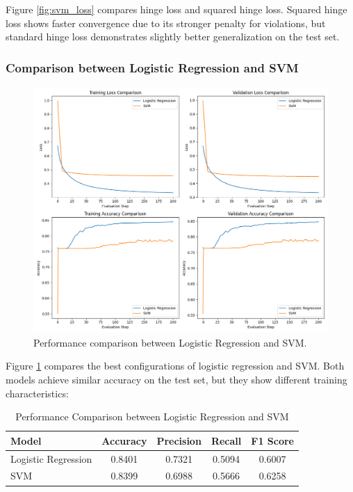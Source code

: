 \documentclass[journal, a4paper]{IEEEtran}
\begin{document}
Figure \ref{fig:svm_loss} compares hinge loss and squared hinge loss. Squared hinge loss shows faster convergence due to its stronger penalty for violations, but standard hinge loss demonstrates slightly better generalization on the test set.

\subsubsection{Comparison between Logistic Regression and SVM}

\begin{figure}[htbp]
\centering
\includegraphics[width=\linewidth]{lr_vs_svm_comparison.png}
\caption{Performance comparison between Logistic Regression and SVM.}
\label{fig:lr_vs_svm}
\end{figure}

Figure \ref{fig:lr_vs_svm} compares the best configurations of logistic regression and SVM. Both models achieve similar accuracy on the test set, but they show different training characteristics:

\begin{table}[htbp]
\centering
\caption{Performance Comparison between Logistic Regression and SVM}
\label{tab:comparison}
\begin{tabular}{lcccc}
\toprule
\textbf{Model} & \textbf{Accuracy} & \textbf{Precision} & \textbf{Recall} & \textbf{F1 Score} \\
\midrule
Logistic Regression & 0.8401 & 0.7321 & 0.5094 & 0.6007 \\
SVM & 0.8399 & 0.6988 & 0.5666 & 0.6258 \\
\bottomrule
\end{tabular}
\end{table}
\end{document}

